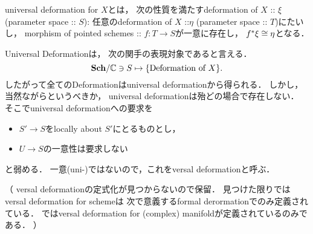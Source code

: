 \documentclass[a4paper]{jsarticle}
\newcommand{\famX}{\mathcal{X}}
\newcommand{\famY}{\mathcal{Y}}
\begin{document}
    \begin{Def}
        universal deformation for $X$とは，
        次の性質を満たすdeformation of $X$ :: $\xi$ (parameter space :: $S$):
        任意のdeformation of $X$ ::$\eta$ (parameter space :: $T$)にたいし，
        morphism of pointed schemes :: $f: T \to S$が一意に存在し，
        $f^* \xi \cong \eta$となる．
    \end{Def}
    Universal Deformationは，
    次の関手の表現対象であると言える．
    \[ \mathbf{Sch}/\mathbb{C} \ni S \mapsto \{ \text{Deformation of $X$} \}. \]
    したがって全てのDeformationはuniversal deformationから得られる．
    しかし，当然ながらというべきか，
    universal deformationは殆どの場合で存在しない．
    そこでuniversal deformationへの要求を
    \begin{itemize}
        \item $S' \to S$をlocally about $S'$にとるものとし，
        \item $U \to S$の一意性は要求しない
    \end{itemize}
    と弱める．
    一意(uni-)ではないので，これをversal deformationと呼ぶ．

    \begin{Def}

        （
        versal deformationの定式化が見つからないので保留．
        見つけた限りではversal deformation for schemeは
        次で意義するformal derormationでのみ定義されている．
        \cite{GACII}ではversal deformation for (complex) manifoldが定義されているのみである．
        ）
    \end{Def}
\end{document}
